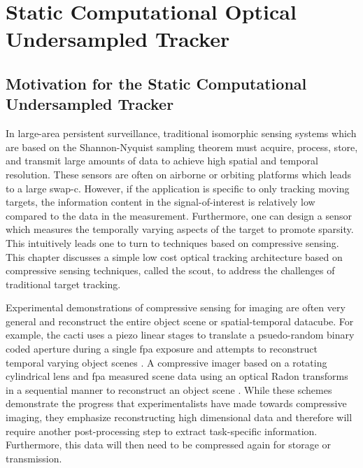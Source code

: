 \chapter{Static Computational Optical Undersampled Tracker}\label{chap:Scout}

\section{Motivation for the Static Computational Undersampled Tracker}

In large-area persistent surveillance, traditional \gls{isomorphic} sensing systems which are based on the Shannon-Nyquist sampling theorem must acquire, process, store, and transmit large amounts of data to achieve high spatial and temporal resolution. These sensors are often on airborne or orbiting platforms which leads to a large \acrfull{swap-c}. However, if the application is specific to only tracking moving targets, the information content in the signal-of-interest is relatively low compared to the data in the measurement. Furthermore, one can design a sensor which measures the temporally varying aspects of the target to promote \gls{sparsity}. This intuitively leads one to turn to techniques based on \gls{compressive sensing}. This chapter discusses a simple low cost optical tracking architecture based on compressive sensing techniques, called the \acrfull{scout}, to address the challenges of traditional target tracking. 

Experimental demonstrations of \gls{compressive sensing} for imaging are often very general and reconstruct the entire object scene or spatial-temporal datacube. For example, the \gls{cacti} uses a piezo linear stages to translate a psuedo-random binary coded aperture during a single \gls{fpa} exposure and attempts to reconstruct temporal varying object scenes \cite{llull2013coded}. A compressive imager based on a rotating cylindrical lens and \gls{fpa} measured scene data using an optical Radon transforms in a sequential manner to reconstruct an object scene \cite{evladov2012progressive}. While these schemes demonstrate the progress that experimentalists have made towards compressive imaging, they emphasize reconstructing high dimensional data and therefore will require another post-processing step to extract task-specific information. Furthermore, this data will then need to be compressed again for storage or transmission. 

